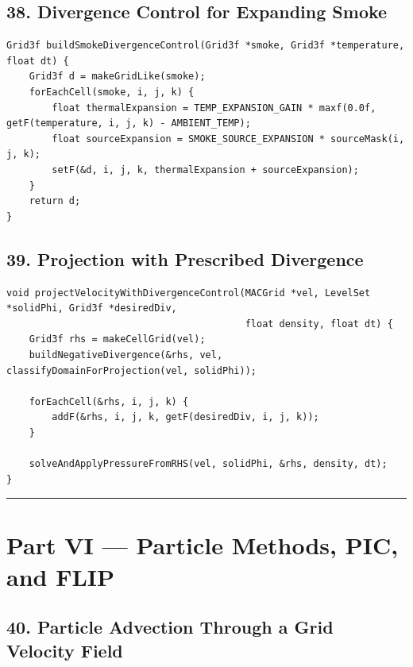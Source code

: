 \documentclass[10pt,letterpaper]{article}
\begin{document}
\subsection*{38. Divergence Control for Expanding Smoke}

\begin{verbatim}
Grid3f buildSmokeDivergenceControl(Grid3f *smoke, Grid3f *temperature, float dt) {
    Grid3f d = makeGridLike(smoke);
    forEachCell(smoke, i, j, k) {
        float thermalExpansion = TEMP_EXPANSION_GAIN * maxf(0.0f, getF(temperature, i, j, k) - AMBIENT_TEMP);
        float sourceExpansion = SMOKE_SOURCE_EXPANSION * sourceMask(i, j, k);
        setF(&d, i, j, k, thermalExpansion + sourceExpansion);
    }
    return d;
}
\end{verbatim}

\subsection*{39. Projection with Prescribed Divergence}

\begin{verbatim}
void projectVelocityWithDivergenceControl(MACGrid *vel, LevelSet *solidPhi, Grid3f *desiredDiv,
                                          float density, float dt) {
    Grid3f rhs = makeCellGrid(vel);
    buildNegativeDivergence(&rhs, vel, classifyDomainForProjection(vel, solidPhi));

    forEachCell(&rhs, i, j, k) {
        addF(&rhs, i, j, k, getF(desiredDiv, i, j, k));
    }

    solveAndApplyPressureFromRHS(vel, solidPhi, &rhs, density, dt);
}
\end{verbatim}

\medskip\hrule\medskip

\clearpage
{}
\section*{Part VI --- Particle Methods, PIC, and FLIP}

\subsection*{40. Particle Advection Through a Grid Velocity Field}
\end{document}
